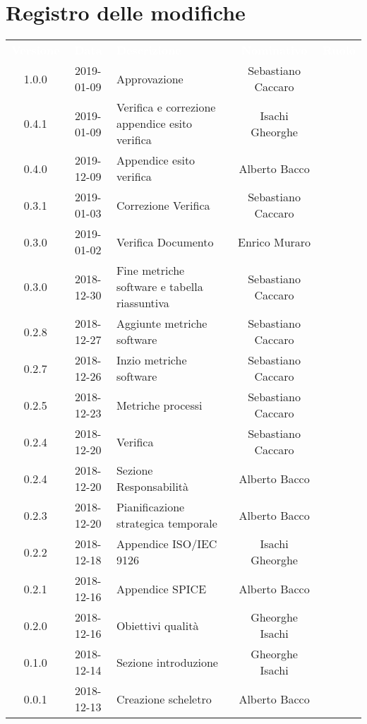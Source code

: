\section*{Registro delle modifiche}
{
	\renewcommand{\arraystretch}{1.5}
	\centering
	\begin{longtable}{c c C{4cm} c  c }
		\textcolor{white}{\textbf{Versione}} &
		\textcolor{white}{\textbf{Data}} &
		\textcolor{white}{\textbf{Descrizione}} &
		\textcolor{white}{\textbf{Nominativo}} &
		\textcolor{white}{\textbf{Ruolo}}
		\\
		1.0.0 &
		2019-01-09 &
		Approvazione &
		Sebastiano Caccaro &
		\Res{}
		\\
		0.4.1 &
		2019-01-09 &
		Verifica e correzione appendice esito verifica &
		Isachi Gheorghe &
		\ver{}
		\\
		0.4.0 &
		2019-12-09 &
		Appendice esito verifica &
		Alberto Bacco &
		\ver{}
		\\
		0.3.1 &
		2019-01-03 &
		Correzione Verifica &
		Sebastiano Caccaro &
		\reda{}
		\\
		0.3.0 &
		2019-01-02 &
		Verifica Documento &
		Enrico Muraro &
		\ver{}
		\\
		0.3.0 &
		2018-12-30 &
		Fine metriche software e tabella riassuntiva &
		Sebastiano Caccaro &
		\reda{}
		\\
		0.2.8 &
		2018-12-27 &
		Aggiunte metriche software  &
		Sebastiano Caccaro &
		\reda{}
		\\
		0.2.7 &
		2018-12-26 &
		Inzio metriche software &
		Sebastiano Caccaro &
		\reda{}
		\\
		0.2.5 &
		2018-12-23 &
		Metriche processi &
		Sebastiano Caccaro &
		\reda{}
		\\
		0.2.4 &
		2018-12-20 &
		Verifica &
		Sebastiano Caccaro &
		\reda{}		
		\\
		0.2.4 &
		2018-12-20 &
		Sezione Responsabilità &
		Alberto Bacco &
		\reda{}
		\\
		0.2.3 &
		2018-12-20 &
		Pianificazione strategica temporale &
		Alberto Bacco &
		\reda{}
		\\
		0.2.2 &
		2018-12-18 &
		Appendice ISO/IEC 9126 &
		Isachi Gheorghe &
		\reda{}
		\\
		0.2.1 &
		2018-12-16 &
		Appendice SPICE &
		Alberto Bacco &
		\reda{}
		\\
		0.2.0 &
		2018-12-16 &
		Obiettivi qualità &
		Gheorghe Isachi &
		\reda{}
		\\
		0.1.0 &
		2018-12-14 &
		Sezione introduzione &
		Gheorghe Isachi&
		\reda{}
		\\
		0.0.1 &
		2018-12-13 &
		Creazione scheletro &
		Alberto Bacco&
		\reda{}
		\\
	\end{longtable}

}